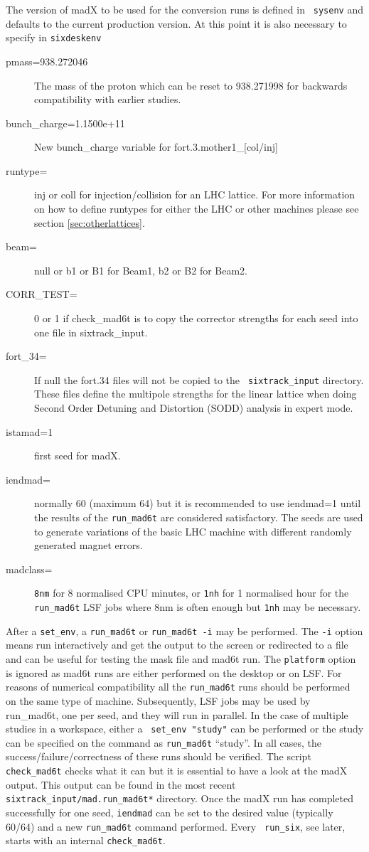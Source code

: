 \documentclass{cernatsnote}
\begin{document}
The version of madX to be used for the conversion runs is defined in {\tt
sysenv} and defaults to the current production version.  At this point it is
also necessary to specify in {\tt sixdeskenv}
\begin{description}
\item [pmass=938.272046] The mass of the proton \cite{NIST} which can be reset
  to 938.271998 for backwards compatibility with earlier studies.
\item [bunch\_charge=1.1500e+11] New bunch\_charge variable for
  fort.3.mother1\_[col/inj]
\item [runtype=] inj or coll for injection/collision for an LHC lattice.  For
  more information on how to define runtypes for either the LHC or other
  machines please see section \ref{sec:otherlattices}.
\item [beam=] null or b1 or B1 for Beam1, b2 or B2 for Beam2.
\item [CORR\_TEST=]0 or 1 if check\_mad6t is to copy the corrector strengths
for each seed into one file in sixtrack\_input.
\item [fort\_34=] If null the fort.34 files will not be copied to the {\tt
  sixtrack\_input} directory. These files define the multipole strengths for
  the linear lattice when doing Second Order Detuning and Distortion (SODD)
  analysis in expert mode.
\item [istamad=1] first seed for madX.
\item [iendmad=] normally 60 (maximum 64) but it is recommended to use
  iendmad=1 until the results of the {\tt run\_mad6t} are considered
  satisfactory.  The seeds are used to generate variations of the basic LHC
  machine with different randomly generated magnet errors.
\item[madclass=] {\tt 8nm} for 8 normalised CPU minutes, or {\tt 1nh} for 1
  normalised hour for the {\tt run\_mad6t} LSF jobs where 8nm is often enough
  but {\tt 1nh} may be necessary.
\end{description}
After a {\tt set\_env}, a {\tt run\_mad6t} or {\tt run\_mad6t -i} may be
performed.  The {\tt -i} option means run interactively and get the output to
the screen or redirected to a file and can be useful for testing the mask file
and mad6t run.  The {\tt platform} option is ignored as mad6t runs are either
performed on the desktop or on LSF. For reasons of numerical compatibility all
the {\tt run\_mad6t} runs should be performed on the same type of machine.
Subsequently, LSF jobs may be used by {run\_mad6t}, one per seed, and they will
run in parallel.  In the case of multiple studies in a workspace, either a {\tt
set\_env "study"} can be performed or the study can be specified on the command
as {\tt run\_mad6t} ``study''.
In all cases, the success/failure/correctness of these runs should be verified.
The script {\tt check\_mad6t} checks what it can but it is essential to have a
look at the madX output. This output can be found in the most recent {\tt
sixtrack\_input/mad.run\_mad6t*} directory.  Once the madX run has completed
successfully for one seed, {\tt iendmad} can be set to the desired value
(typically 60/64) and a new {\tt run\_mad6t} command performed. Every {\tt
run\_six}, see later, starts with an internal {\tt check\_mad6t}.
\end{document}
